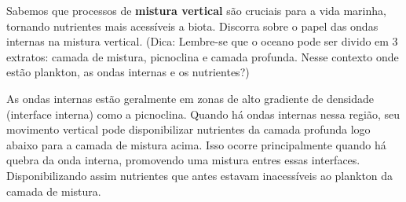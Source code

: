 \documentclass[letterpaper,portuguese,12pt,pdftex]{exam}
\begin{document}
\begin{questions}

\question[2]
Sabemos que processos de {\bf mistura vertical} são cruciais para a vida
marinha, tornando nutrientes mais acessíveis a biota.  Discorra sobre o papel
das ondas internas na mistura vertical.  (Dica: Lembre-se que o oceano pode ser
divido em 3 extratos: camada de mistura, picnoclina e camada profunda.  Nesse
contexto onde estão plankton, as ondas internas e os nutrientes?)

\begin{solution}
  As ondas internas estão geralmente em zonas de alto gradiente de densidade
  (interface interna) como a picnoclina.  Quando há ondas internas nessa região,
  seu movimento vertical pode disponibilizar nutrientes da camada profunda logo
  abaixo para a camada de mistura acima.  Isso ocorre principalmente quando há
  quebra da onda interna, promovendo uma mistura entres essas interfaces.
  Disponibilizando assim nutrientes que antes estavam inacessíveis ao plankton da camada de mistura.
\end{solution}


\end{questions}
\end{document}
